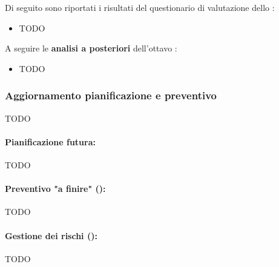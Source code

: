 \par Di seguito sono riportati i risultati del questionario di valutazione dello :
\begin{itemize}
  \item TODO
\end{itemize}

\vspace{0.5\baselineskip}
\par A seguire le \textbf{analisi a posteriori} dell'ottavo :
\begin{itemize}
  \item TODO
\end{itemize}

\subsubsection{Aggiornamento pianificazione e preventivo}
\par
TODO

\paragraph*{Pianificazione futura:}
\par
TODO

\paragraph*{Preventivo "a finire" ():}
\par
TODO

\paragraph*{Gestione dei rischi ():}
\par
TODO
